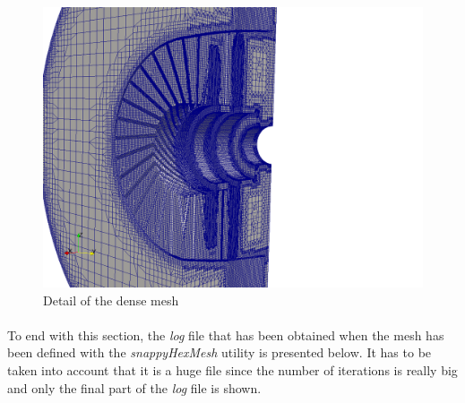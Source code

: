 \begin{figure}[h!]
\includegraphics[scale=0.24]{./mesh/newmesh/dense2}
\centering
\caption{Detail of the dense mesh}
\label{dense3}
\end{figure}

\paragraph{}To end with this section, the \textit{log} file that has been obtained when the mesh has been defined with the \textit{snappyHexMesh} utility is presented below. It has to be taken into account that it is a huge file since the number of iterations is really big and only the final part of the \textit{log} file is shown.

